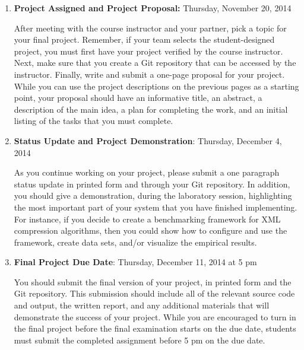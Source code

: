 \vspace*{-.05in}
\begin{enumerate}

  \itemsep0in

  \item {\bf Project Assigned and Project Proposal:} Thursday, November 20, 2014

    After meeting with the course instructor and your partner, pick a topic for your final project.  Remember, if your
    team selects the student-designed project, you must first have your project verified by the course instructor.  Next, make
    sure that you create a Git repository that can be accessed by the instructor. Finally, write and submit a one-page
    proposal for your project. While you can use the project descriptions on the previous pages as a starting point,
    your proposal should have an informative title, an abstract, a description of the main idea, a plan for completing
    the work, and an initial listing of the tasks that you must complete.

  \item {\bf Status Update and Project Demonstration}: Thursday, December 4, 2014

    As you continue working on your project, please submit a one paragraph status update in printed form and through
    your Git repository.  In addition, you should give a demonstration, during the laboratory session, highlighting the
    most important part of your system that you have finished implementing. For instance, if you decide to create a
    benchmarking framework for XML compression algorithms, then you could show how to configure and use the framework,
    create data sets, and/or visualize the empirical results.

  \item {\bf Final Project Due Date}: Thursday, December 11, 2014 at 5 pm

    You should submit the final version of your project, in printed form and the Git repository. This submission should
    include all of the relevant source code and output, the written report, and any additional materials that will
    demonstrate the success of your project.  While you are encouraged to turn in the final project before the final
    examination starts on the due date, students must submit the completed assignment before 5 pm on the due date.

\end{enumerate}
\vspace*{-.05in}


